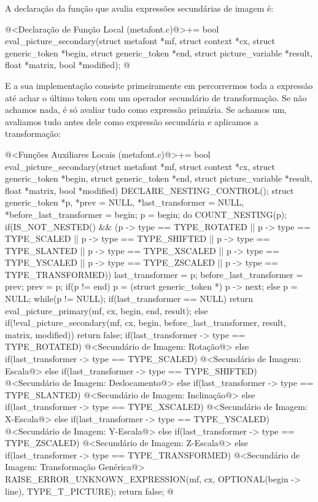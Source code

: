 {{{{{{A declaração da função que avalia expressões secundárias de imagem é:

\iniciocodigo
@<Declaração de Função Local (metafont.c)@>+=
bool eval_picture_secondary(struct metafont *mf, struct context *cx,
                            struct generic_token *begin,
                            struct generic_token *end,
                            struct picture_variable *result,
                            float *matrix, bool *modified);
@
\fimcodigo

E a sua implementação consiste primeiramente em percorrermos toda a
expressão até achar o último token com um operador secundário de
transformação. Se não achamos nada, é só avaliar tudo como expressão
primária. Se achamos um, avaliamos tudo antes dele como expressão
secundária e aplicamos a transformação:

\iniciocodigo
@<Funções Auxiliares Locais (metafont.c)@>+=
bool eval_picture_secondary(struct metafont *mf, struct context *cx,
                            struct generic_token *begin,
                            struct generic_token *end,
                            struct picture_variable *result,
                            float *matrix, bool *modified){
  DECLARE_NESTING_CONTROL();
  struct generic_token *p, *prev = NULL, *last_transformer = NULL,
                       *before_last_transformer = begin;
  p = begin;
  do{
    COUNT_NESTING(p);
    if(IS_NOT_NESTED() && (p -> type == TYPE_ROTATED ||
       p -> type == TYPE_SCALED || p -> type == TYPE_SHIFTED ||
       p -> type == TYPE_SLANTED || p -> type == TYPE_XSCALED ||
       p -> type == TYPE_YSCALED || p -> type == TYPE_ZSCALED ||
       p -> type == TYPE_TRANSFORMED)){
      last_transformer = p;
      before_last_transformer = prev;
    }
    prev = p;
    if(p != end)
      p = (struct generic_token *) p -> next;
    else
      p = NULL;
  }while(p != NULL);
  if(last_transformer == NULL)
    return eval_picture_primary(mf, cx, begin, end, result);
  else{
    if(!eval_picture_secondary(mf, cx, begin, before_last_transformer, result,
                               matrix, modified))
      return false;
    if(last_transformer -> type == TYPE_ROTATED){
      @<Secundário de Imagem: Rotação@>
    }
    else if(last_transformer -> type == TYPE_SCALED){
      @<Secundário de Imagem: Escala@>
    }
    else if(last_transformer -> type == TYPE_SHIFTED){
      @<Secundário de Imagem: Deslocamento@>
    }
    else if(last_transformer -> type == TYPE_SLANTED){
      @<Secundário de Imagem: Inclinação@>
    }
    else if(last_transformer -> type == TYPE_XSCALED){
      @<Secundário de Imagem: X-Escala@>
    }
    else if(last_transformer -> type == TYPE_YSCALED){
      @<Secundário de Imagem: Y-Escala@>
    }
    else if(last_transformer -> type == TYPE_ZSCALED){
      @<Secundário de Imagem: Z-Escala@>
    }
    else if(last_transformer -> type == TYPE_TRANSFORMED){
      @<Secundário de Imagem: Transformação Genérica@>
    }
    RAISE_ERROR_UNKNOWN_EXPRESSION(mf, cx, OPTIONAL(begin -> line),
                                   TYPE_T_PICTURE);
    return false;
  }
}
@
\fimcodigo

}}}}}}
